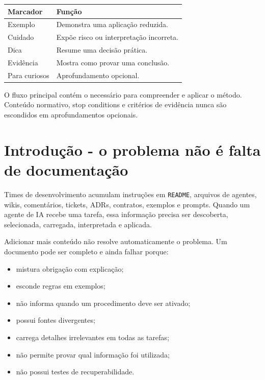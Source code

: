 \documentclass[
  10pt,
  a4paper,
  oneside]{book}
\providecommand{\tightlist}{%
  \setlength{\itemsep}{0pt}\setlength{\parskip}{0pt}}
\begin{document}
\begin{longtable}[]{@{}ll@{}}
\toprule\noalign{}
Marcador & Função \\
\midrule\noalign{}
\endhead
\bottomrule\noalign{}
\endlastfoot
Exemplo & Demonstra uma aplicação reduzida. \\
Cuidado & Expõe risco ou interpretação incorreta. \\
Dica & Resume uma decisão prática. \\
Evidência & Mostra como provar uma conclusão. \\
Para curiosos & Aprofundamento opcional. \\
\end{longtable}

O fluxo principal contém o necessário para compreender e aplicar o
método. Conteúdo normativo, stop conditions e critérios de evidência
nunca são escondidos em aprofundamentos opcionais.

\hypertarget{introduuxe7uxe3o---o-problema-nuxe3o-uxe9-falta-de-documentauxe7uxe3o}{%
\chapter{Introdução - o problema não é falta de
documentação}\label{introduuxe7uxe3o---o-problema-nuxe3o-uxe9-falta-de-documentauxe7uxe3o}}

Times de desenvolvimento acumulam instruções em \texttt{README},
arquivos de agentes, wikis, comentários, tickets, ADRs, contratos,
exemplos e prompts. Quando um agente de IA recebe uma tarefa, essa
informação precisa ser descoberta, selecionada, carregada, interpretada
e aplicada.

Adicionar mais conteúdo não resolve automaticamente o problema. Um
documento pode ser completo e ainda falhar porque:

\begin{itemize}
\tightlist
\item
  mistura obrigação com explicação;
\item
  esconde regras em exemplos;
\item
  não informa quando um procedimento deve ser ativado;
\item
  possui fontes divergentes;
\item
  carrega detalhes irrelevantes em todas as tarefas;
\item
  não permite provar qual informação foi utilizada;
\item
  não possui testes de recuperabilidade.
\end{itemize}
\end{document}
